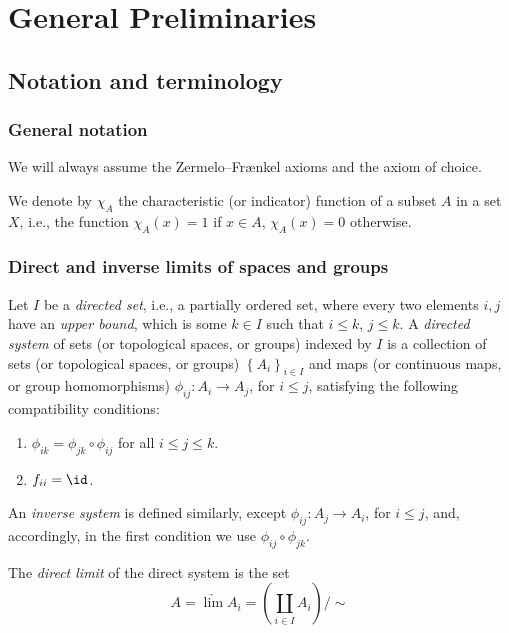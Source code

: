 \chapter{General Preliminaries}
\section{Notation and terminology}
\subsection{General notation}
\begin{convention}
We will always assume the Zermelo--Frænkel axioms and the axiom
of choice.
\end{convention}
\begin{convention}
We denote by $\chi_A$ the characteristic (or indicator) function
of a subset $A$ in a set $X$, i.e., the function $\chi_A(x)=1$ if
$x\in A$, $\chi_A(x)=0$ otherwise.
\end{convention}
\subsection{Direct and inverse limits of spaces and groups}
Let $I$ be a \emph{directed set}, i.e., a partially ordered set,
where every two elements $i,j$ have an \emph{upper bound}, which
is some $k\in I$ such that $i\leq k$, $j\leq k$. A \emph{directed
  system} of sets (or topological spaces, or groups) indexed by
$I$ is a collection of sets (or topological spaces, or groups)
$\left\{A_i\right\}_{i\in I}$ and maps (or continuous maps, or
group homomorphisms) $\phi_{ij}\colon A_i\to A_j$, for $i\leq j$,
satisfying the following compatibility conditions:
\begin{enumerate}[noitemsep,label=(\arabic*)]
\item $\phi_{ik}=\phi_{jk}\circ\phi_{ij}$ for all $i\leq j\leq
  k$.
\item $f_{ii}=\id$.
\end{enumerate}
An \emph{inverse system} is defined similarly, except
$\phi_{ij}\colon A_j\to A_i$, for $i\leq j$, and, accordingly, in
the first condition we use $\phi_{ij}\circ\phi_{jk}$.

The \emph{direct limit} of the direct system is the set
\[
A=\underrightarrow{\lim} A_i=\left(\coprod_{i\in I} A_i\right)/\sim
\]

